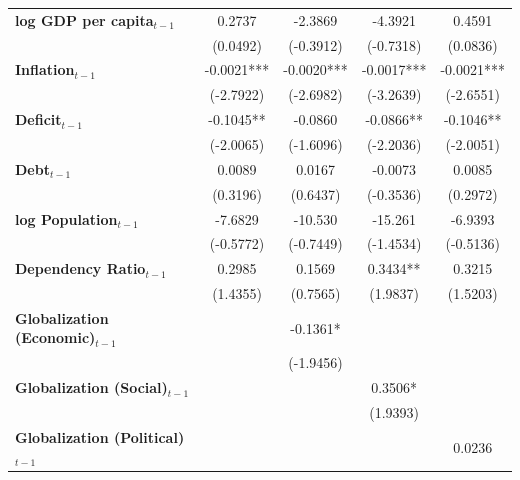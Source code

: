 \begin{center}
\begin{tabular}{lcccc}
\textbf{log GDP per capita$_{t-1}$}           &     0.2737     &     -2.3869      &     -4.3921      &      0.4591       \\
\textbf{ }                         &    (0.0492)    &    (-0.3912)     &    (-0.7318)     &     (0.0836)      \\
\textbf{Inflation$_{t-1}$}      &   -0.0021***   &    -0.0020***    &    -0.0017***    &    -0.0021***     \\
\textbf{ }                         &   (-2.7922)    &    (-2.6982)     &    (-3.2639)     &    (-2.6551)      \\
\textbf{Deficit$_{t-1}$}             &   -0.1045**    &     -0.0860      &    -0.0866**     &    -0.1046**      \\
\textbf{ }                         &   (-2.0065)    &    (-1.6096)     &    (-2.2036)     &    (-2.0051)      \\
\textbf{Debt$_{t-1}$}                &     0.0089     &      0.0167      &     -0.0073      &      0.0085       \\
\textbf{ }                         &    (0.3196)    &     (0.6437)     &    (-0.3536)     &     (0.2972)      \\
\textbf{log Population$_{t-1}$}      &    -7.6829     &     -10.530      &     -15.261      &     -6.9393       \\
\textbf{ }                         &   (-0.5772)    &    (-0.7449)     &    (-1.4534)     &    (-0.5136)      \\
\textbf{Dependency Ratio$_{t-1}$}   &     0.2985     &      0.1569      &     0.3434**     &      0.3215       \\
\textbf{ }                         &    (1.4355)    &     (0.7565)     &     (1.9837)     &     (1.5203)      \\
\textbf{Globalization (Economic)$_{t-1}$}             &                &     -0.1361*     &                  &                   \\
\textbf{ }                         &                &    (-1.9456)     &                  &                   \\
\textbf{Globalization (Social)$_{t-1}$}             &                &                  &     0.3506*      &                   \\
\textbf{ }                         &                &                  &     (1.9393)     &                   \\
\textbf{Globalization (Political)$_{t-1}$}             &                &                  &                  &      0.0236       \\

\end{tabular}
\end{center}
